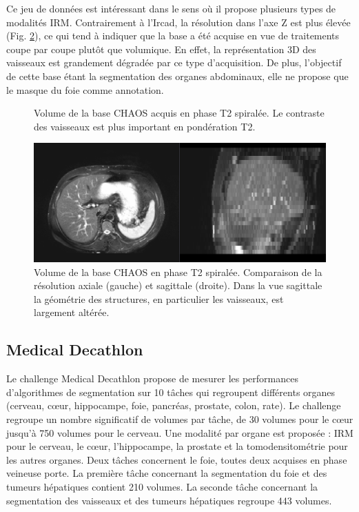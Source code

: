 Ce jeu de données est intéressant dans le sens où il propose plusieurs types de modalités IRM. Contrairement à l'Ircad, la résolution dans l'axe Z est plus élevée (Fig. \ref{fig:CHAOS_geometry}), ce qui tend à indiquer que la base a été acquise en vue de traitements coupe par coupe plutôt que volumique. En effet, la représentation 3D des vaisseaux est grandement dégradée par ce type d'acquisition.  De plus, l'objectif de cette base étant la segmentation des organes abdominaux, elle ne propose que le masque du foie comme annotation.

\begin{figure}
    \centering
    \caption{Volume de la base CHAOS acquis en phase T2 spiralée. Le contraste des vaisseaux est plus important en pondération T2.}
    \label{fig:T2_MRI}
\end{figure}

\begin{figure}
    \centering
    \includegraphics[width=\textwidth]{Images/CHAOS_resolution.png}
    \caption{Volume de la base CHAOS en phase T2 spiralée. Comparaison de la résolution axiale (gauche) et sagittale (droite). Dans la vue sagittale la géométrie des structures, en particulier les vaisseaux, est largement altérée.}
    \label{fig:CHAOS_geometry}
\end{figure}

\subsection{Medical Decathlon}

Le challenge Medical Decathlon propose de mesurer les performances d'algorithmes de segmentation sur 10 tâches qui regroupent différents organes (cerveau, cœur, hippocampe, foie, pancréas, prostate, colon, rate). Le challenge regroupe un nombre significatif de volumes par tâche, de 30 volumes pour le cœur jusqu'à 750 volumes pour le cerveau. Une modalité par organe est proposée : IRM pour le cerveau, le cœur, l'hippocampe, la prostate et la tomodensitométrie pour les autres organes. Deux tâches concernent le foie, toutes deux acquises en phase veineuse porte. La première tâche concernant la segmentation du foie et des tumeurs hépatiques contient 210 volumes. La seconde tâche concernant la segmentation des vaisseaux et des tumeurs hépatiques regroupe 443 volumes.

